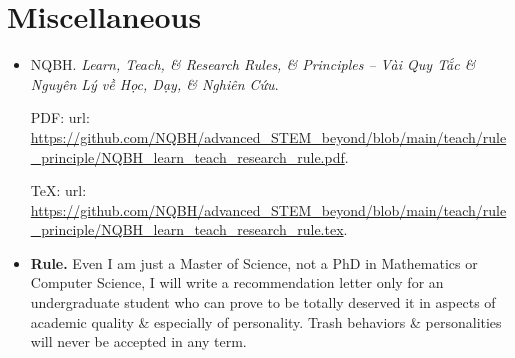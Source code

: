 \documentclass{article}
\begin{document}

\section{Miscellaneous}

\begin{itemize}
	\item NQBH. \emph{Learn, Teach, \& Research Rules, \& Principles -- Vài Quy Tắc \& Nguyên Lý về Học, Dạy, \& Nghiên Cứu}.
	
	PDF: {\sc url}: \url{https://github.com/NQBH/advanced_STEM_beyond/blob/main/teach/rule_principle/NQBH_learn_teach_research_rule.pdf}.
	
	\TeX: {\sc url}: \url{https://github.com/NQBH/advanced_STEM_beyond/blob/main/teach/rule_principle/NQBH_learn_teach_research_rule.tex}.
	\item \textbf{\textsf{Rule.}} Even I am just a Master of Science, not a PhD in Mathematics or Computer Science, I will write a recommendation letter only for an undergraduate student who can prove to be totally deserved it in aspects of academic quality \& especially of personality. Trash behaviors \& personalities will never be accepted in any term.
\end{itemize}


\printbibliography[heading=bibintoc]
\end{document}
